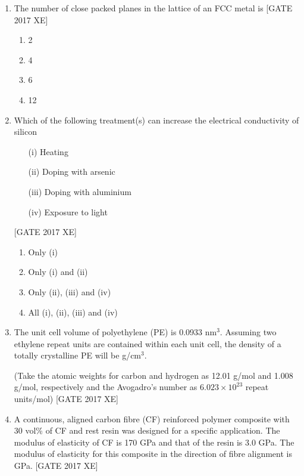\documentclass[journal,12pt,onecolumn]{IEEEtran}
\theoremstyle{remark}
\begin{document}
\begin{enumerate}
\item The number of close packed planes in the lattice of an FCC metal is  
\hfill [GATE 2017 XE]

\begin{multicols}{2}
\begin{enumerate}
    \item 2
    \item 4
    \item 6
    \item 12
\end{enumerate}
\end{multicols}

\item Which of the following treatment(s) can increase the electrical conductivity of silicon  
\begin{enumerate}
    \item[(i)] Heating  
    \item[(ii)] Doping with arsenic  
    \item[(iii)] Doping with aluminium  
    \item[(iv)] Exposure to light  
\end{enumerate}
\hfill [GATE 2017 XE]

\begin{multicols}{2}
\begin{enumerate}
    \item Only (i)
    \item Only (i) and (ii)
    \item Only (ii), (iii) and (iv)
    \item All (i), (ii), (iii) and (iv)
\end{enumerate}
\end{multicols}
\item The unit cell volume of polyethylene (PE) is 0.0933 nm$^3$. Assuming two ethylene repeat units are
contained within each unit cell, the density of a totally crystalline PE will be \underline{\hspace{2cm}} g/cm$^3$.  

(Take the atomic weights for carbon and hydrogen as 12.01 g/mol and 1.008 g/mol, respectively and
the Avogadro’s number as $6.023 \times 10^{23}$ repeat units/mol)  
\hfill [GATE 2017 XE]

\item A continuous, aligned carbon fibre (CF) reinforced polymer composite with 30 vol\% of CF and rest resin was designed for a specific application. The modulus of elasticity of CF is 170 GPa and that of the resin is 3.0 GPa. The modulus of elasticity for this composite in the direction of fibre alignment is \underline{\hspace{2cm}} GPa.  
\hfill [GATE 2017 XE]


\end{enumerate}
\end{document}

